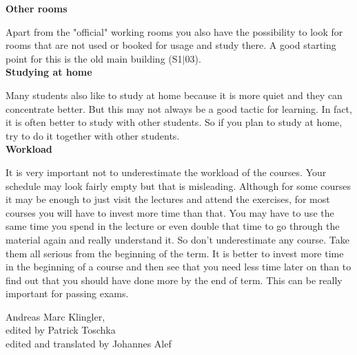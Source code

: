 {    \noindent\textbf{Other rooms}

    Apart from the "official" working rooms you also have the possibility to look for rooms that are not used or booked for usage and study there. A good starting point for this is the old main building (S1$|$03). \\

    \noindent\textbf{Studying at home}

    Many students also like to study at home because it is more quiet and they can concentrate better. But this may not always be a good tactic for learning. In fact, it is often better to study with other students. So if you plan to study at home, try to do it together with other students.\\

    \noindent\textbf{Workload}

    It is very important not to underestimate the workload of the courses. Your schedule may look fairly empty but that is misleading. Although for some courses it may be enough to just visit the lectures and attend the exercises, for most courses you will have to invest more time than that. You may have to use the same time you spend in the lecture or even double that time to go through the material again and really understand it. So don't underestimate any course. Take them all serious from the beginning of the term. It is better to invest more time in the beginning of a course and then see that you need less time later on than to find out that you should have done more by the end of term. This can be really important for passing exams.
}
{Andreas Marc Klingler,\\edited by Patrick Toschka\\edited and translated by Johannes Alef}
